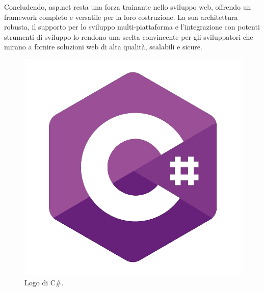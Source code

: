 Concludendo, \acrshort{asp.net} resta una forza trainante nello sviluppo web, offrendo un \gls{framework} completo e versatile per la loro costruzione. La sua architettura robusta, il supporto per lo sviluppo multi-piattaforma e l'integrazione con potenti strumenti di sviluppo lo rendono una scelta convincente per gli sviluppatori che mirano a fornire soluzioni web di alta qualità, scalabili e sicure.
\begin{figure}[H]
\centering
\includegraphics[width=.5\textwidth]{Images/c-sharp.png}
\caption{\label{fig:c-sharp}Logo di C\#.}
\end{figure}